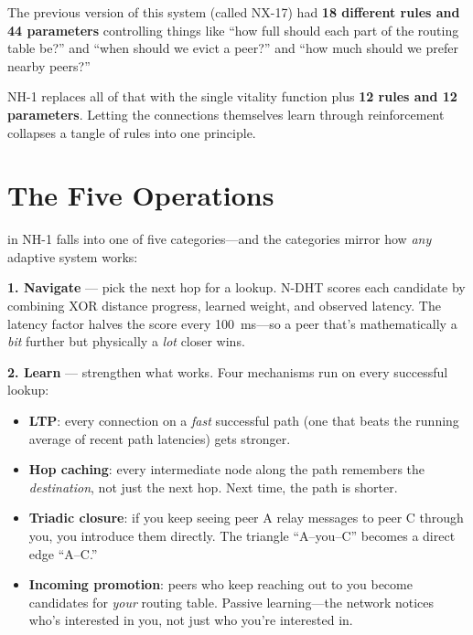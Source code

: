 \documentclass[nobib]{tufte-handout}
\begin{document}
The previous version of this system (called NX-17) had \textbf{18 different rules and 44 parameters} controlling things like ``how full should each part of the routing table be?'' and ``when should we evict a peer?'' and ``how much should we prefer nearby peers?''

NH-1 replaces all of that with the single vitality function plus \textbf{12 rules and 12 parameters}. Letting the connections themselves learn through reinforcement collapses a tangle of rules into one principle.

\section{The Five Operations}

 in NH-1 falls into one of five categories---and the categories mirror how \emph{any} adaptive system works:

\textbf{1. Navigate} --- pick the next hop for a lookup. N-DHT scores each candidate by combining XOR distance progress, learned weight, and observed latency. The latency factor halves the score every 100~ms---so a peer that's mathematically a \emph{bit} further but physically a \emph{lot} closer wins.

\textbf{2. Learn} --- strengthen what works. Four mechanisms run on every successful lookup:

\begin{itemize}
  \item \textbf{LTP}: every connection on a \emph{fast} successful path (one that beats the running average of recent path latencies) gets stronger.
  \item \textbf{Hop caching}: every intermediate node along the path remembers the \emph{destination}, not just the next hop. Next time, the path is shorter.
  \item \textbf{Triadic closure}: if you keep seeing peer A relay messages to peer C through you, you introduce them directly. The triangle ``A--you--C'' becomes a direct edge ``A--C.''
  \item \textbf{Incoming promotion}: peers who keep reaching out to you become candidates for \emph{your} routing table. Passive learning---the network notices who's interested in you, not just who you're interested in.
\end{itemize}
\end{document}
